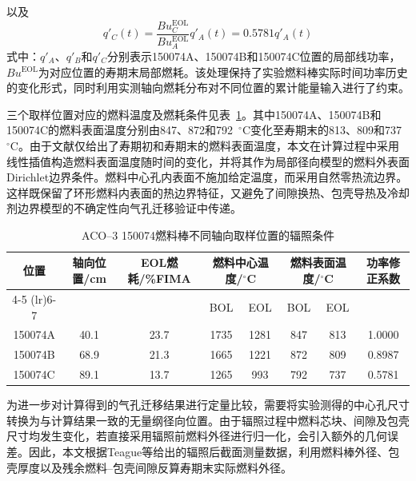 以及
\begin{equation}
	q'_{C}(t)
	=
	\frac{Bu_{C}^{\mathrm{EOL}}}
	{Bu_{A}^{\mathrm{EOL}}}
	q'_{A}(t)
	=
	0.5781q'_{A}(t)
	\label{eq:aco3_power_scale_c}
\end{equation}
\noindent 式中：$q'_{A}$、$q'_{B}$和$q'_{C}$分别表示150074A、150074B和150074C位置的局部线功率，$Bu^{\mathrm{EOL}}$为对应位置的寿期末局部燃耗。该处理保持了实验燃料棒实际时间功率历史的变化形式，同时利用实测轴向燃耗分布对不同位置的累计能量输入进行了约束。

三个取样位置对应的燃料温度及燃耗条件见表~\ref{tab:aco3_sample_conditions}。其中150074A、150074B和150074C的燃料表面温度分别由847、872和792~${}^{\circ}$C变化至寿期末的813、809和737~${}^{\circ}$C。由于文献仅给出了寿期初和寿期末的燃料表面温度，本文在计算过程中采用线性插值构造燃料表面温度随时间的变化，并将其作为局部径向模型的燃料外表面Dirichlet边界条件。燃料中心孔内表面不施加给定温度，而采用自然零热流边界。这样既保留了环形燃料内表面的热边界特征，又避免了间隙换热、包壳导热及冷却剂边界模型的不确定性向气孔迁移验证中传递。

\begin{table}[htbp]
	\centering
	\caption{ACO--3 150074燃料棒不同轴向取样位置的辐照条件}
	\label{tab:aco3_sample_conditions}
	\setlength{\tabcolsep}{4pt}
\begin{tabular}{cccccccc}
		\toprule
		位置 &
		轴向位置/cm &
		EOL燃耗/\%FIMA &
		\multicolumn{2}{c}{燃料中心温度/${}^{\circ}$C} &
		\multicolumn{2}{c}{燃料表面温度/${}^{\circ}$C} &
		功率修正系数 \\
		\cmidrule(lr){4-5}
		\cmidrule(lr){6-7}
		& & & BOL & EOL & BOL & EOL & \\
		\midrule
		150074A & 40.1 & 23.7 & 1735 & 1281 & 847 & 813 & 1.0000 \\
		150074B & 68.9 & 21.3 & 1665 & 1221 & 872 & 809 & 0.8987 \\
		150074C & 89.1 & 13.7 & 1265 &  993 & 792 & 737 & 0.5781 \\
		\bottomrule
	\end{tabular}
\end{table}

为进一步对计算得到的气孔迁移结果进行定量比较，需要将实验测得的中心孔尺寸转换为与计算结果一致的无量纲径向位置。由于辐照过程中燃料芯块、间隙及包壳尺寸均发生变化，若直接采用辐照前燃料外径进行归一化，会引入额外的几何误差。因此，本文根据Teague等\cite{teagueMicrostructuralCharacterizationHigh2013}给出的辐照后截面测量数据，利用燃料棒外径、包壳厚度以及残余燃料--包壳间隙反算寿期末实际燃料外径。


